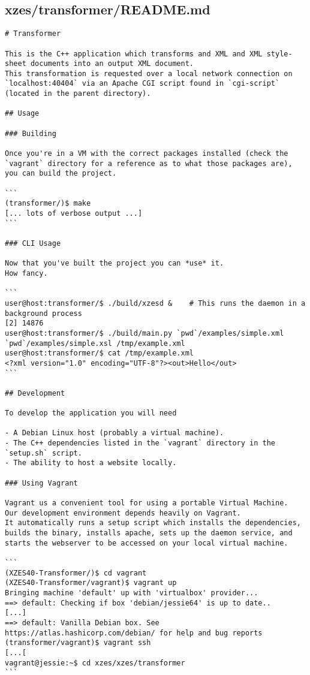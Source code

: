 \subsection{xzes/transformer/README.md}
\begin{lstlisting}[caption={Documentation about the transformer as a whole.}]
# Transformer

This is the C++ application which transforms and XML and XML style-sheet documents into an output XML document.
This transformation is requested over a local network connection on `localhost:40404` via an Apache CGI script found in `cgi-script` (located in the parent directory).

## Usage

### Building

Once you're in a VM with the correct packages installed (check the `vagrant` directory for a reference as to what those packages are), you can build the project.

```
(transformer/)$ make
[... lots of verbose output ...]
```

### CLI Usage

Now that you've built the project you can *use* it.
How fancy.

```
user@host:transformer/$ ./build/xzesd &    # This runs the daemon in a background process
[2] 14876
user@host:transformer/$ ./build/main.py `pwd`/examples/simple.xml `pwd`/examples/simple.xsl /tmp/example.xml
user@host:transformer/$ cat /tmp/example.xml
<?xml version="1.0" encoding="UTF-8"?><out>Hello</out>
```

## Development

To develop the application you will need

- A Debian Linux host (probably a virtual machine).
- The C++ dependencies listed in the `vagrant` directory in the `setup.sh` script.
- The ability to host a website locally.

### Using Vagrant

Vagrant us a convenient tool for using a portable Virtual Machine.
Our development environment depends heavily on Vagrant.
It automatically runs a setup script which installs the dependencies, builds the binary, installs apache, sets up the daemon service, and starts the webserver to be accessed on your local virtual machine.

```
(XZES40-Transformer/)$ cd vagrant
(XZES40-Transformer/vagrant)$ vagrant up
Bringing machine 'default' up with 'virtualbox' provider...
==> default: Checking if box 'debian/jessie64' is up to date..
[...]
==> default: Vanilla Debian box. See https://atlas.hashicorp.com/debian/ for help and bug reports
(transformer/vagrant)$ vagrant ssh
[...[
vagrant@jessie:~$ cd xzes/xzes/transformer
```


\end{lstlisting}
